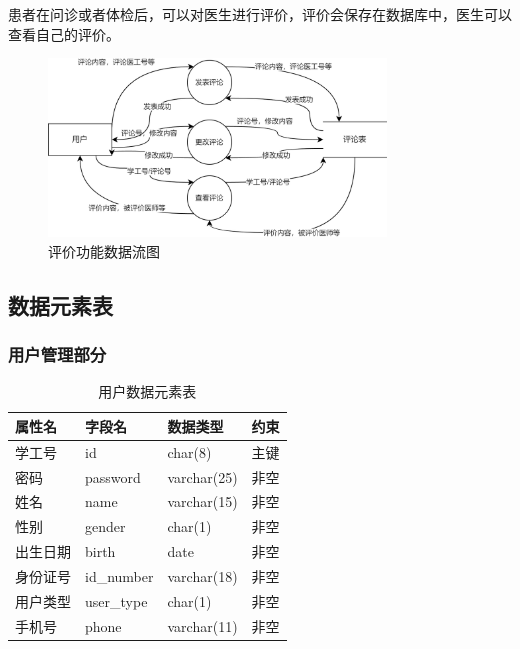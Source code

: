\documentclass{article}
\begin{document}
患者在问诊或者体检后，可以对医生进行评价，评价会保存在数据库中，医生可以查看自己的评价。

\begin{figure}[H]
    \centering
    \includegraphics[width=0.8\textwidth]{images/evaluation_dataflow.png}
    \caption{评价功能数据流图}
\end{figure}

\subsection{数据元素表}
\subsubsection{用户管理部分}

\begin{table}[H]
    \centering
    \begin{tabularx}{\textwidth}{|>{\raggedright\arraybackslash}X|>{\raggedright\arraybackslash}X|>{\raggedright\arraybackslash}X|>{\raggedright\arraybackslash}X|}
    \toprule
    \textbf{属性名} & \textbf{字段名} & \textbf{数据类型} & \textbf{约束} \\ \midrule
    学工号 & id & char(8) & 主键 \\ \midrule
    密码 & password & varchar(25) & 非空 \\ \midrule
    姓名 & name & varchar(15) & 非空 \\ \midrule
    性别 & gender & char(1) & 非空 \\ \midrule
    出生日期 & birth & date & 非空 \\ \midrule
    身份证号 & id\_number & varchar(18) & 非空 \\ \midrule
    用户类型 & user\_type & char(1) & 非空 \\ \midrule
    手机号 & phone & varchar(11) & 非空 \\ \bottomrule
    \end{tabularx}
    \caption{用户数据元素表}
    \label{tab:student_user_elements}
\end{table}
\end{document}
